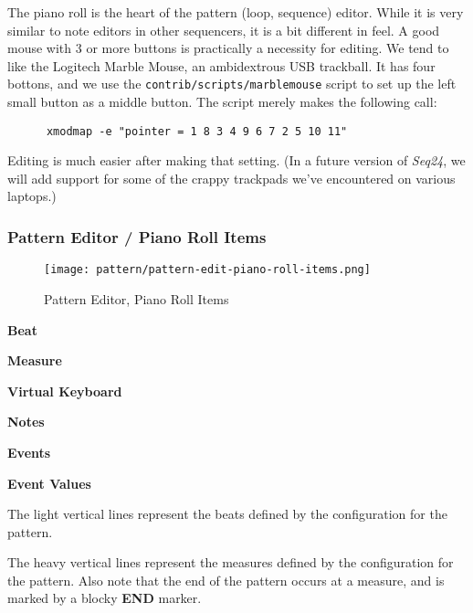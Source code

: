    The piano roll is the heart of the pattern (loop, sequence) editor.
   While it is very similar to note editors in other sequencers, it is a bit
   different in feel.  A good mouse with 3 or more buttons is practically a
   necessity for editing.  We tend to like the Logitech Marble Mouse, an
   ambidextrous USB trackball.  It has four bottons, and we use the
   \texttt{contrib/scripts/marblemouse} script to set up the left small
   button as a middle button.  The script merely makes the following call:

   \begin{verbatim}
      xmodmap -e "pointer = 1 8 3 4 9 6 7 2 5 10 11"
   \end{verbatim}

   Editing is much easier after making that setting.  (In a future
   version of \textsl{Seq24}, we will add support for some of the
   crappy trackpads we've encountered on various laptops.)

\subsubsection{Pattern Editor / Piano Roll Items}
\label{subsubsec:seq24_pattern_editor_piano_roll_items}

\begin{figure}[H]
   \centering 
   \texttt{[image: pattern/pattern-edit-piano-roll-items.png]}
   \caption{Pattern Editor, Piano Roll Items}
   \label{fig:pattern_editor_piano_roll_items}
\end{figure}

   \begin{enumber}
      \item \textbf{Beat}
      \item \textbf{Measure}
      \item \textbf{Virtual Keyboard}
      \item \textbf{Notes}
      \item \textbf{Events}
      \item \textbf{Event Values}
   \end{enumber}

   \setcounter{ItemCounter}{0}      %

   The light vertical lines represent the beats defined by the configuration
   for the pattern.

   The heavy vertical lines represent the measures defined by the
   configuration for the pattern.
   Also note that the end of the pattern
   occurs at a measure, and is marked by a blocky \textbf{END} marker.

